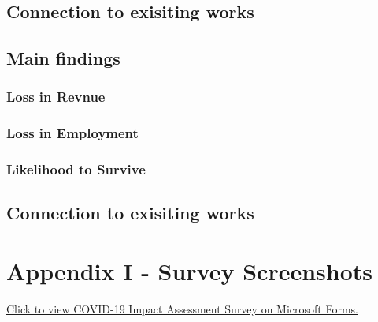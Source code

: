 \documentclass[
]{article}
\begin{document}
\hypertarget{connection-to-exisiting-works}{%
\subsection{Connection to exisiting works}\label{connection-to-exisiting-works}}

\hypertarget{main-findings}{%
\subsection{Main findings}\label{main-findings}}

\hypertarget{loss-in-revnue}{%
\subsubsection{Loss in Revnue}\label{loss-in-revnue}}

\hypertarget{loss-in-employment}{%
\subsubsection{Loss in Employment}\label{loss-in-employment}}

\hypertarget{likelihood-to-survive}{%
\subsubsection{Likelihood to Survive}\label{likelihood-to-survive}}

\hypertarget{connection-to-exisiting-works-1}{%
\subsection{Connection to exisiting works}\label{connection-to-exisiting-works-1}}

\newpage

\hypertarget{appendix-i---survey-screenshots}{%
\section*{Appendix I - Survey Screenshots}\label{appendix-i---survey-screenshots}}

\href{https://forms.office.com/Pages/DesignPage.aspx?auth_pvr=OrgId\&auth_upn=youjing.li\%40mail.utoronto.ca\&lang=en-US\&origin=OfficeDotCom\&route=Start\#FormId=JsKqeAMvTUuQN7RtVsVSEAjdpN_qx5NFt_LaslGa8CtUMEQxM0pSMzRQSkIwS0xKOFBIRzMyNU1aUi4u}{Click to view COVID-19 Impact Assessment Survey on Microsoft Forms.}
\end{document}
